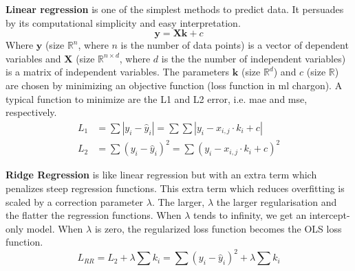 %
\textbf{Linear regression} is one of the simplest methods to predict data. 
It persuades by its computational simplicity and easy interpretation. 
\begin{equation}
\mathbf{y} = \mathbf{X} \mathbf{k} +c 
\end{equation}
Where $\mathbf{y}$ (size $\mathbb{R}^n$, where $n$ is the number of data points) is a vector of dependent variables and $\mathbf{X}$ (size $\mathbb{R}^{n\times d}$, where $d$ is the the number of independent variables) is a matrix of independent variables. 
The parameters $\mathbf{k}$ (size $\mathbb{R}^d$) and $c$ (size $\mathbb{R}$) are chosen by minimizing an objective function (loss function in \gls{ml} chargon).
A typical function to minimize are the L1 and L2 error, i.e. \gls{mae} and \gls{mse}, respectively.
\begin{align}
L_1&= \sum |y_i - \hat y_i| = \sum \sum |y_i - x_{i,j}\cdot k_i+c| \\
L_2&= \sum(y_i - \hat y_i)^2 = \sum (y_i - x_{i,j}\cdot k_i+c)^2
\end{align}
%

\textbf{Ridge Regression} is like linear regression but with an extra term which penalizes steep regression functions.
This extra term which reduces overfitting is scaled by a correction parameter $\lambda$. 
The larger, $\lambda$ the larger regularisation and the flatter the regression functions. 
When $\lambda$ tends to infinity, we get an intercept-only model.
When $\lambda$ is zero, the regularized loss function becomes the OLS loss function.
\begin{equation}
    L_{RR} = L_2 + \lambda \sum k_i = \sum(y_i - \hat y_i)^2 + \lambda \sum k_i
\end{equation}

